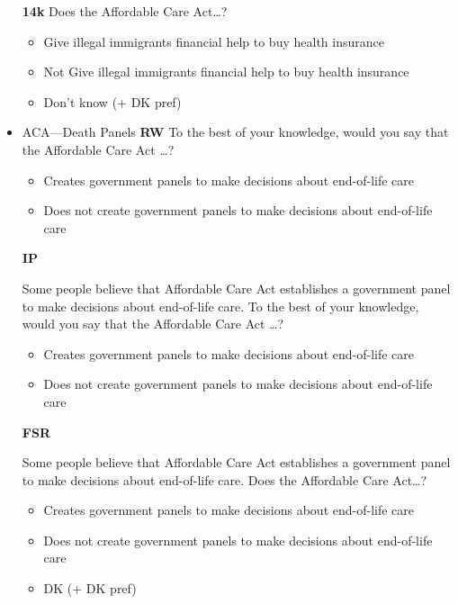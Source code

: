 \begin{itemize}
	\textbf{14k}\newline
	Does the Affordable Care Act\ldots?
	\begin{itemize}
		\item Give illegal immigrants financial help to buy health insurance
		\item Not Give illegal immigrants financial help to buy health insurance
		\item Don't know (+ DK pref)
	\end{itemize}
	
	\item ACA—Death Panels\newline
	\textbf{RW}\newline
	To the best of your knowledge, would you say that the Affordable Care Act \ldots?
	\begin{itemize}
		\item Creates government panels to make decisions about end-of-life care
		\item Does not create government panels to make decisions about end-of-life care
	\end{itemize}
	
	\textbf{IP}\newline
	
	Some people believe that Affordable Care Act establishes a government panel to
	make decisions about end-of-life care. To the best of your knowledge, would you say
	that the Affordable Care Act \ldots?
	\begin{itemize}
		\item Creates government panels to make decisions about end-of-life care
		\item Does not create government panels to make decisions about end-of-life care
	\end{itemize}
	
	\textbf{FSR}\newline
	
	Some people believe that Affordable Care Act establishes a government panel to
	make decisions about end-of-life care. Does the Affordable Care Act\ldots?
	\begin{itemize}
		\item Creates government panels to make decisions about end-of-life care
		\item Does not create government panels to make decisions about end-of-life care
		\item DK (+ DK pref)
	\end{itemize}
	

\end{itemize}

